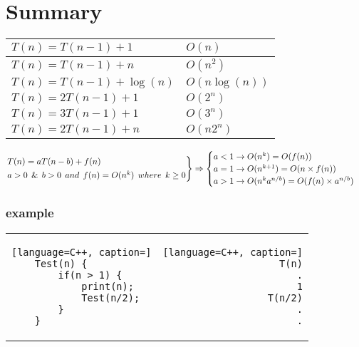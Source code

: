 \documentclass[12pt]{article}
\begin{document}
\section{Summary}






\begin{center}
  \bgroup
  \def\arraystretch{1.5}%
  \begin{tabular}{ l | l  }
	$T(n) = T(n-1) + 1$
	&
	{ \Large  
	$O(n)$
	}
	\\ \hline
	$T(n) = T(n-1) + n$
	&
	{ \Large  
	$O(n^{2})$
	}
	\\ \hline
	$T(n) = T(n-1) + \log{(n)}$
	&
	{ \Large  
	$O(n\log{(n)})$
	}
	\\ \hline
	$T(n) = 2T(n-1) +1$
	&
	{ \Large  
	$O(2^{n})$
	}
	\\ \hline
	$T(n) = 3T(n-1) + 1$
	&
	{ \Large  
	$O(3^{n})$
	}
	\\ \hline
	$T(n) = 2T(n-1) +n$
	&
	{ \Large  
	$O(n2^{n})$
	}
	\\ 
  \end{tabular}
  \egroup
\end{center}






\begin{align*}
\begin{rcases}
T(n) = aT(n-b) + f(n) \\
a > 0 \:\: \& \:\: b > 0 \:\: and \:\: f(n) = O(n^{k}) \:\: where \:\: k \geq 0 
\end{rcases} \Rightarrow 
\begin{cases}
a < 1 \to O(n^{k}) = O(f(n)) \\
a = 1 \to O(n^{k+1}) = O( n \times f(n))  \\
a > 1 \to O(n^{k} a^{n/b}) = O(f(n) \times a^{n/b}) \\
\end{cases}
\end{align*}







\subsubsection{example}






\begin{center}
  \bgroup
  \def\arraystretch{1.5}%
  \begin{tabular}{ E  D  }
	\begin{lstlisting}[language=C++, caption=]
	Test(n) {
		if(n > 1) {
			print(n);
			Test(n/2);
		}
	}
	\end{lstlisting}
     &  
	\begin{lstlisting}[language=C++, caption=]
	T(n)
	.
	1
	T(n/2)
	.
	.
	\end{lstlisting}
  \end{tabular}
  \egroup
\end{center}
\end{document}

